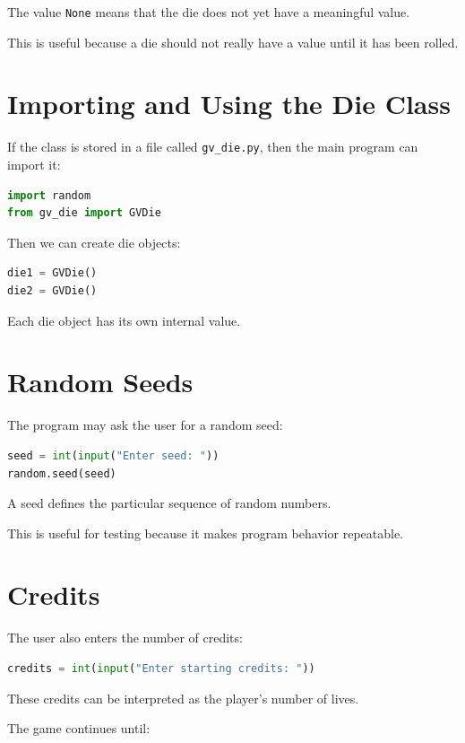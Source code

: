 \documentclass[11pt]{article}
\begin{document}
The value \texttt{None} means that the die does not yet have a meaningful value.

This is useful because a die should not really have a value until it has been rolled.

\section{Importing and Using the Die Class}

If the class is stored in a file called \texttt{gv\_die.py}, then the main program can import it:

\begin{lstlisting}[language=Python]
import random
from gv_die import GVDie
\end{lstlisting}

Then we can create die objects:

\begin{lstlisting}[language=Python]
die1 = GVDie()
die2 = GVDie()
\end{lstlisting}

Each die object has its own internal value.

\section{Random Seeds}

The program may ask the user for a random seed:

\begin{lstlisting}[language=Python]
seed = int(input("Enter seed: "))
random.seed(seed)
\end{lstlisting}

A seed defines the particular sequence of random numbers.

This is useful for testing because it makes program behavior repeatable.

\section{Credits}

The user also enters the number of credits:

\begin{lstlisting}[language=Python]
credits = int(input("Enter starting credits: "))
\end{lstlisting}

These credits can be interpreted as the player's number of lives.

The game continues until:
\end{document}
